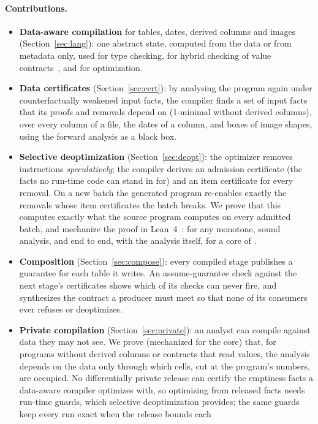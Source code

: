 \paragraph{Contributions.}
\begin{itemize}
\item \textbf{Data-aware compilation} for tables, dates, derived columns and images
(Section~\ref{sec:lang}): one abstract state, computed from the data or from metadata only, used for
type checking, for hybrid checking of value contracts~\cite{flanagan2006}, and for optimization.
\item \textbf{Data certificates} (Section~\ref{sec:cert}): by analysing the program again under
counterfactually weakened input facts, the compiler finds a set of input facts that its proofs
and removals depend on (1-minimal without derived columns), over every column of a file, the dates
of a column, and boxes of image shapes, using the forward analysis as a black box.
\item \textbf{Selective deoptimization} (Section~\ref{sec:deopt}): the optimizer removes
instructions \emph{speculatively}; the compiler derives an admission certificate (the facts no
run-time code can stand in for) and an item certificate for every removal. On a new batch the
generated program re-enables exactly the removals whose item certificates the batch breaks. We
prove that this computes exactly what the source program computes on every admitted batch, and
mechanize the proof in Lean~4~\cite{lean4}: for any monotone, sound analysis, and end to end, with the
analysis itself, for a core of \PL.
\item \textbf{Composition} (Section~\ref{sec:compose}): every compiled stage publishes a guarantee
for each table it writes. An assume-guarantee check against the next stage's certificates shows
which of its checks can never fire, and synthesizes the contract a producer must meet so that none
of its consumers ever refuses or deoptimizes.
\item \textbf{Private compilation} (Section~\ref{sec:private}): an analyst can compile against data
they may not see. We prove (mechanized for the core) that, for programs without derived columns or
contracts that read values, the analysis depends on the data only through which cells, cut at the
program's numbers, are occupied. No differentially private release can certify the emptiness facts a
data-aware compiler optimizes with, so optimizing from released facts needs run-time guards, which
selective deoptimization provides; the same guards keep every run exact when the release bounds each

\end{itemize}
